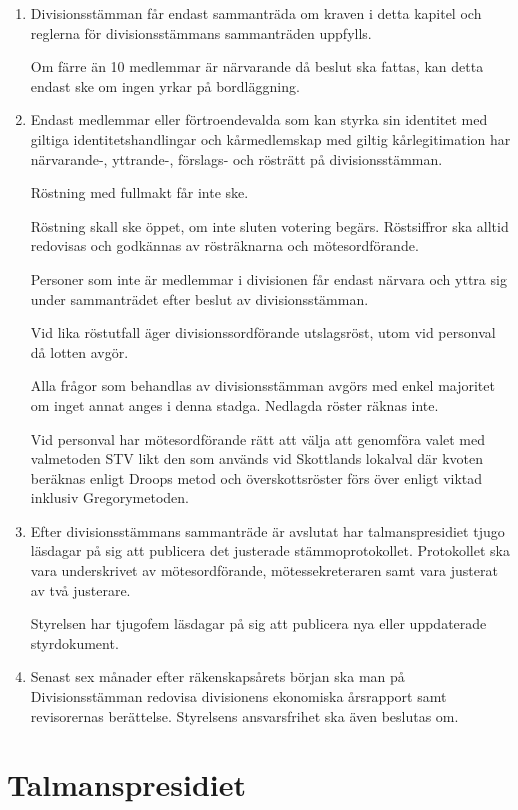 \documentclass{dvd}
\begin{document}
\begin{enumerate}[label=\arabic* §, ref=\arabic*]
		\item Divisionsstämman får endast sammanträda om kraven i detta kapitel och reglerna för divisionsstämmans sammanträden uppfylls.

		Om färre än 10 medlemmar är närvarande då beslut ska fattas, kan detta endast ske om ingen yrkar på bordläggning.

		\item Endast medlemmar eller förtroendevalda som kan styrka sin identitet med giltiga identitetshandlingar och kårmedlemskap med giltig kårlegitimation har närvarande-, yttrande-, förslags- och rösträtt på divisionsstämman.

		Röstning med fullmakt får inte ske.

		Röstning skall ske öppet, om inte sluten votering begärs.
		Röstsiffror ska alltid redovisas och godkännas av rösträknarna och mötesordförande.

		Personer som inte är medlemmar i divisionen får endast närvara och yttra sig under sammanträdet efter beslut av divisionsstämman.

		Vid lika röstutfall äger divisionssordförande utslagsröst, utom vid personval då lotten avgör.

		Alla frågor som behandlas av divisionsstämman avgörs med enkel majoritet om inget annat anges i denna stadga.
		Nedlagda röster räknas inte.

		Vid personval har mötesordförande rätt att välja att genomföra valet med valmetoden STV likt den som används vid Skottlands lokalval där kvoten beräknas enligt Droops metod och överskottsröster förs över enligt viktad inklusiv Gregorymetoden.

		\item Efter divisionsstämmans sammanträde är avslutat har talmanspresidiet tjugo läsdagar på sig att publicera det justerade stämmoprotokollet.
		Protokollet ska vara underskrivet av mötesordförande, mötessekreteraren samt vara justerat av två justerare.

		Styrelsen har tjugofem läsdagar på sig att publicera nya eller uppdaterade styrdokument.

		\item Senast sex månader efter räkenskapsårets början ska man på Divisionsstämman redovisa divisionens ekonomiska årsrapport samt revisorernas berättelse.
		Styrelsens ansvarsfrihet ska även beslutas om.
	\end{enumerate}

	\section{Talmanspresidiet}
\end{document}
